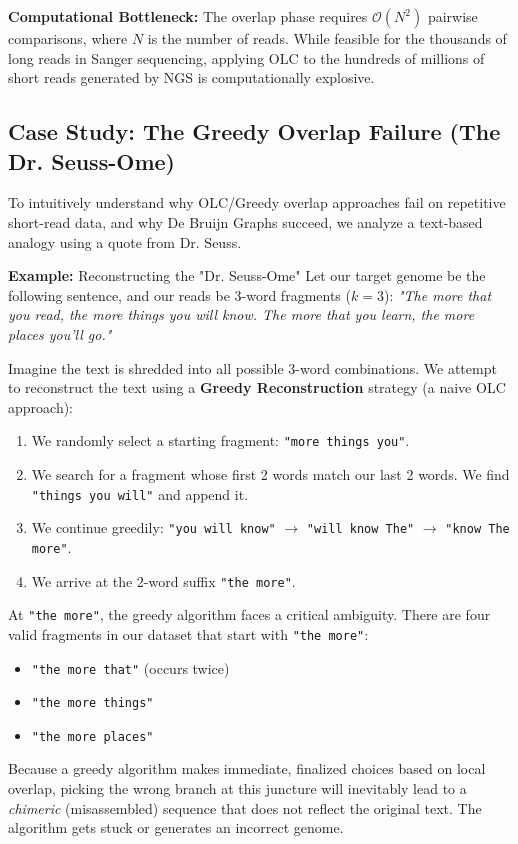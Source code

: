\sta \textbf{Computational Bottleneck:} The overlap phase requires $\mathcal{O}(N^2)$ pairwise comparisons, where $N$ is the number of reads. While feasible for the thousands of long reads in Sanger sequencing, applying OLC to the hundreds of millions of short reads generated by NGS is computationally explosive.

\subsection{Case Study: The Greedy Overlap Failure (The Dr. Seuss-Ome)}
To intuitively understand why OLC/Greedy overlap approaches fail on repetitive short-read data, and why De Bruijn Graphs succeed, we analyze a text-based analogy using a quote from Dr. Seuss.

\textbf{Example:} Reconstructing the "Dr. Seuss-Ome"
Let our target genome be the following sentence, and our reads be 3-word fragments ($k=3$):
\textit{"The more that you read, the more things you will know. The more that you learn, the more places you'll go."}

Imagine the text is shredded into all possible 3-word combinations. We attempt to reconstruct the text using a \textbf{Greedy Reconstruction} strategy (a naive OLC approach):
\begin{enumerate}
    \item We randomly select a starting fragment: \texttt{"more things you"}.
    \item We search for a fragment whose first 2 words match our last 2 words. We find \texttt{"things you will"} and append it.
    \item We continue greedily: \texttt{"you will know"} $\rightarrow$ \texttt{"will know The"} $\rightarrow$ \texttt{"know The more"}.
    \item We arrive at the 2-word suffix \texttt{"the more"}. 
\end{enumerate}

At \texttt{"the more"}, the greedy algorithm faces a critical ambiguity. There are four valid fragments in our dataset that start with \texttt{"the more"}:
\begin{itemize}
    \item \texttt{"the more that"} (occurs twice)
    \item \texttt{"the more things"}
    \item \texttt{"the more places"}
\end{itemize}
Because a greedy algorithm makes immediate, finalized choices based on local overlap, picking the wrong branch at this juncture will inevitably lead to a \textit{chimeric} (misassembled) sequence that does not reflect the original text. The algorithm gets stuck or generates an incorrect genome.

